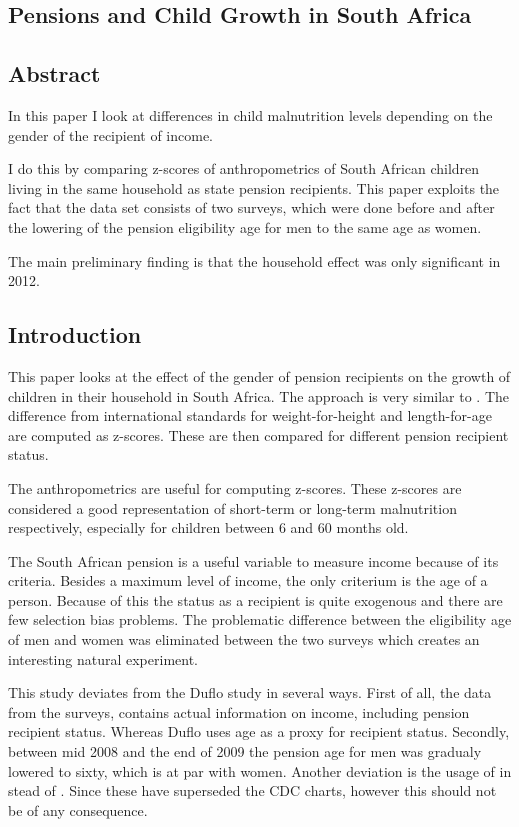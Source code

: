 \documentclass[a4paper]{report}
\begin{document}
\begin{refsection}
\chapter{Pensions and Child Growth in South Africa}
\label{sa}
\section*{Abstract}
In this paper I look at differences in child malnutrition levels depending on the gender of the recipient of income.

I do this by comparing z-scores of anthropometrics of South African children living in the same household as state pension recipients.
This paper exploits the fact that the data set consists of two surveys,
which were done before and after the lowering of the pension eligibility age for men to the same age as women.

The main preliminary finding is that the household effect was only significant in 2012.

\section{Introduction}
\label{sa:intro}
This paper looks at the effect of the gender of pension recipients on the growth of children in their household in South Africa.
The approach is very similar to \textcite{duflo2000child,duflo2003grandmothers}.
The difference from international standards \parencite[WHO Child Growth Standards]{who2006child} for weight-for-height and length-for-age are computed as z-scores.
These are then compared for different pension recipient status.

The anthropometrics are useful for computing z-scores. These z-scores are considered a good representation of short-term or long-term malnutrition respectively, especially for children between 6 and 60 months old.

The South African pension is a useful variable to measure income because of its criteria.
Besides a maximum level of income, the only criterium is the age of a person.
Because of this the status as a recipient is quite exogenous and there are few selection bias problems.
The problematic difference between the eligibility age of men and women was eliminated between the two surveys which creates an interesting natural experiment.

This study deviates from the Duflo study in several ways.
First of all, the data from the \textcite{saldru2008nids,saldru2012nids} surveys, contains actual information on income,
including pension recipient status.
Whereas Duflo uses age as a proxy for recipient status.
Secondly, between mid 2008 and the end of 2009 the pension age for men was gradualy lowered to sixty, which is at par with women.
Another deviation is the usage of \textcite[WHO Child Growth Standards]{who2006child} in stead of \textcite[CDC Growth Charts: United States]{nchs2000cdc}.
Since these have superseded the CDC charts, however this should not be of any consequence.


\end{refsection}
\end{document}
